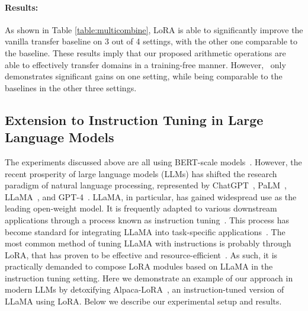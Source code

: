 
\paragraph{Results:}
As shown in Table \ref{table:multicombine}, LoRA is able to significantly improve the vanilla transfer baseline on 3 out of 4 settings, with the other one comparable to the baseline. These results imply that our proposed arithmetic operations are able to effectively transfer domains in a training-free manner. 
However, \ia~only demonstrates significant gains on one setting, while being comparable to the baselines in the other three settings. 

\subsection{Extension to Instruction Tuning in Large Language Models}
\label{sec:llama}
The experiments discussed above are all using BERT-scale
models~\citep{devlin-etal-2019-bert}. However, the recent prosperity of large language models (LLMs) has shifted the research paradigm of natural language processing, represented by ChatGPT~\citep{chatgpt}, PaLM~\citep{chowdhery2022palm}, LLaMA~\citep{touvron2023llama}, and GPT-4~\citep{openai2023gpt4}.
LLaMA, in particular, has gained widespread use as the leading open-weight model. It is frequently adapted to various downstream applications through a process known as instruction tuning~\citep{sanh2022multitask,chung2022scaling,wang2022self}. This process has become standard for integrating LLaMA into task-specific applications~\citep{alpaca}.
The most common method of tuning LLaMA with instructions is probably through LoRA, that has proven to be effective and resource-efficient~\citep{xu2023baize,alpacalora}.
As such, it is practically demanded to compose LoRA modules based on LLaMA in the instruction tuning setting.
Here we demonstrate an example of our approach in modern LLMs by detoxifying Alpaca-LoRA~\citep{alpacalora},
an instruction-tuned version of LLaMA using LoRA. Below we describe our experimental setup and results.

